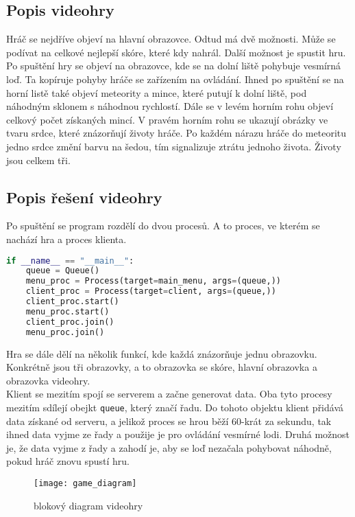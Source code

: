 \documentclass[12pt]{report}			%
\begin{document}
\subsection{Popis videohry}
Hráč se nejdříve objeví na hlavní obrazovce. Odtud má dvě možnosti. Může se podívat na celkové nejlepší skóre, které kdy nahrál. Další možnost je spustit hru. Po spuštění hry se objeví na obrazovce, kde se na dolní liště pohybuje vesmírná loď. Ta kopíruje pohyby hráče se zařízením na ovládání. Ihned po spuštění se na horní listě také objeví meteority a mince, které putují k dolní liště, pod náhodným sklonem s náhodnou rychlostí. Dále se v levém horním rohu objeví celkový počet získaných mincí. V pravém horním rohu se ukazují obrázky ve tvaru srdce, které znázorňují životy hráče. Po každém nárazu hráče do meteoritu jedno srdce změní barvu na šedou, tím signalizuje ztrátu jednoho života. Životy jsou celkem tři. 


\subsection{Popis řešení videohry}
Po spuštění se program rozdělí do dvou procesů. A to proces, ve kterém se nachází hra a proces klienta. 

\begin{lstlisting}[title={Program game.py}, caption={game.py}, language=Python]
if __name__ == "__main__":
    queue = Queue() 
    menu_proc = Process(target=main_menu, args=(queue,)) 
    client_proc = Process(target=client, args=(queue,))  
    client_proc.start()
    menu_proc.start()
    client_proc.join()
    menu_proc.join()
\end{lstlisting}

Hra se dále dělí na několik funkcí, kde každá znázorňuje jednu obrazovku. Konkrétně jsou tři obrazovky, a to obrazovka se skóre, hlavní obrazovka a obrazovka videohry.
\\
Klient se mezitím spojí se serverem a začne generovat data. Oba tyto procesy mezitím sdílejí obejkt \texttt{queue}, který značí řadu. Do tohoto objektu klient přidává data získané od serveru, a jelikož proces se hrou běží 60-krát za sekundu, tak ihned data vyjme ze řady a použije je pro ovládání vesmírné lodi. Druhá možnost je, že data vyjme z řady a zahodí je, aby se loď nezačala pohybovat náhodně, pokud hráč znovu spustí hru.


\begin{figure}[h]
\caption{blokový diagram videohry}
\centering
\texttt{[image: game\_diagram]}
\end{figure}
\end{document}
